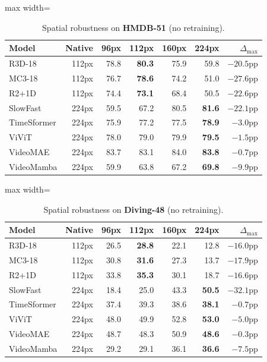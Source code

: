 \documentclass[runningheads]{llncs}
\newcommand{\tabtight}{\setlength{\tabcolsep}{3.5pt}\renewcommand{\arraystretch}{1.12}}
\begin{document}
\begin{table}[!htbp]
\centering
\caption{Spatial robustness on \textbf{HMDB-51} (no retraining).}
\label{tab:sup_sp_hmdb}
\scriptsize\tabtight
\begin{adjustbox}{max width=\textwidth}
\begin{tabular}{l r rrrr r}
\toprule
Model & Native & 96px & 112px & 160px & 224px & $\Delta_\text{max}$ \\
\midrule
R3D-18      & 112px & 78.8 & \textbf{80.3} & 75.9 & 59.8 & $-20.5$pp \\
MC3-18      & 112px & 76.7 & \textbf{78.6} & 74.2 & 51.0 & $-27.6$pp \\
R2+1D       & 112px & 74.4 & \textbf{73.1} & 68.4 & 50.5 & $-22.6$pp \\
SlowFast    & 224px & 59.5 & 67.2 & 80.5 & \textbf{81.6} & $-22.1$pp \\
\midrule
TimeSformer & 224px & 75.9 & 77.2 & 77.5 & \textbf{78.9} & $-3.0$pp \\
ViViT       & 224px & 78.0 & 79.0 & 79.9 & \textbf{79.5} & $-1.5$pp \\
VideoMAE    & 224px & 83.7 & 83.1 & 84.0 & \textbf{83.8} & $-0.7$pp \\
VideoMamba  & 224px & 59.9 & 63.8 & 67.2 & \textbf{69.8} & $-9.9$pp \\
\bottomrule
\end{tabular}
\end{adjustbox}
\end{table}

\begin{table}[!htbp]
\centering
\caption{Spatial robustness on \textbf{Diving-48} (no retraining).}
\label{tab:sup_sp_div}
\scriptsize\tabtight
\begin{adjustbox}{max width=\textwidth}
\begin{tabular}{l r rrrr r}
\toprule
Model & Native & 96px & 112px & 160px & 224px & $\Delta_\text{max}$ \\
\midrule
R3D-18      & 112px & 26.5 & \textbf{28.8} & 22.1 & 12.8 & $-16.0$pp \\
MC3-18      & 112px & 30.8 & \textbf{31.6} & 27.3 & 13.7 & $-17.9$pp \\
R2+1D       & 112px & 33.8 & \textbf{35.3} & 30.1 & 18.7 & $-16.6$pp \\
SlowFast    & 224px & 18.4 & 25.0 & 43.3 & \textbf{50.5} & $-32.1$pp \\
\midrule
TimeSformer & 224px & 37.4 & 39.3 & 38.6 & \textbf{38.1} & $-0.7$pp \\
ViViT       & 224px & 48.0 & 49.9 & 52.8 & \textbf{53.0} & $-5.0$pp \\
VideoMAE    & 224px & 48.7 & 48.3 & 50.9 & \textbf{48.6} & $-0.3$pp \\
VideoMamba  & 224px & 29.2 & 29.1 & 36.1 & \textbf{36.6} & $-7.5$pp \\
\bottomrule
\end{tabular}
\end{adjustbox}
\end{table}
\end{document}
